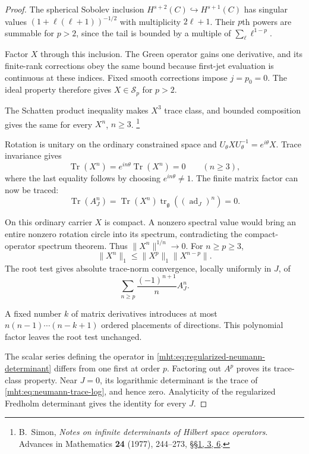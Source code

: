 \begin{proof}
The spherical Sobolev inclusion $H^{s+2}(C)\hookrightarrow
H^{s+1}(C)$ has singular values
$(1+\ell(\ell+1))^{-1/2}$ with multiplicity $2\ell+1$.
Their $p$th powers are summable for $p>2$, since the tail is
bounded by a multiple of $\sum_\ell\ell^{1-p}$.

Factor $X$ through this inclusion. The Green operator gains
one derivative, and its finite-rank corrections obey the same
bound because first-jet evaluation is continuous at these indices.
Fixed smooth corrections impose $j=p_0=0$. The ideal property
therefore gives $X\in\mathcal S_p$ for $p>2$.

The Schatten product inequality makes $X^3$ trace class, and
bounded composition gives the same for every $X^n$, $n\geq3$.
\footnote{B.~Simon, \emph{Notes on infinite determinants of Hilbert
space operators}. Advances in Mathematics \textbf{24} (1977),
244--273, \href{https://math.caltech.edu/SimonPapers/74.pdf}{\S\S1, 3, 6}.}

Rotation is unitary on the ordinary constrained space and
$U_\theta XU_\theta^{-1}=e^{i\theta}X$. Trace invariance gives
\[
 \operatorname{Tr}(X^n)=e^{in\theta}\operatorname{Tr}(X^n)=0
 \qquad(n\geq3),
\]
where the last equality follows by choosing $e^{in\theta}\ne1$.
The finite matrix factor can now be traced:
\[
 \operatorname{Tr}(A_J^n)=\operatorname{Tr}(X^n)
                    \operatorname{tr}_{\mathfrak g}
                         ((\operatorname{ad}_J)^n)=0.
\]

On this ordinary carrier $X$ is compact. A nonzero spectral
value would bring an entire nonzero rotation circle into its
spectrum, contradicting the compact-operator spectrum theorem.
Thus $\|X^n\|^{1/n}\to0$. For $n\geq p\geq3$,
\[
 \|X^n\|_1\leq\|X^p\|_1\|X^{n-p}\|.
\]
The root test gives absolute trace-norm convergence, locally
uniformly in $J$, of
\begin{equation}\label{mht:eq:neumann-trace-log}
 \sum_{n\geq p}\frac{(-1)^{n+1}}{n}A_J^n.
\end{equation}

A fixed number $k$ of matrix derivatives introduces at most
$n(n-1)\cdots(n-k+1)$ ordered placements of directions. This
polynomial factor leaves the root test unchanged.

The scalar series defining the operator in
\eqref{mht:eq:regularized-neumann-determinant} differs from one
first at order $p$. Factoring out $A^p$ proves its trace-class
property. Near $J=0$, its logarithmic determinant is the trace
of \eqref{mht:eq:neumann-trace-log}, and hence zero.
Analyticity of the regularized Fredholm determinant gives the
identity for every $J$.
\end{proof}

